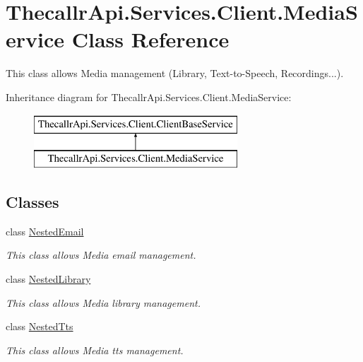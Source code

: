 \hypertarget{class_thecallr_api_1_1_services_1_1_client_1_1_media_service}{\section{Thecallr\+Api.\+Services.\+Client.\+Media\+Service Class Reference}
\label{class_thecallr_api_1_1_services_1_1_client_1_1_media_service}
}


This class allows Media management (Library, Text-\/to-\/\+Speech, Recordings...).  


Inheritance diagram for Thecallr\+Api.\+Services.\+Client.\+Media\+Service\+:\begin{figure}[H]
\begin{center}
\leavevmode
\includegraphics[height=2.000000cm]{class_thecallr_api_1_1_services_1_1_client_1_1_media_service}
\end{center}
\end{figure}
\subsection*{Classes}
\begin{DoxyCompactItemize}
\item 
class \hyperlink{class_thecallr_api_1_1_services_1_1_client_1_1_media_service_1_1_nested_email}{Nested\+Email}
\begin{DoxyCompactList}\small\item\em This class allows Media email management. \end{DoxyCompactList}\item 
class \hyperlink{class_thecallr_api_1_1_services_1_1_client_1_1_media_service_1_1_nested_library}{Nested\+Library}
\begin{DoxyCompactList}\small\item\em This class allows Media library management. \end{DoxyCompactList}\item 
class \hyperlink{class_thecallr_api_1_1_services_1_1_client_1_1_media_service_1_1_nested_tts}{Nested\+Tts}
\begin{DoxyCompactList}\small\item\em This class allows Media tts management. \end{DoxyCompactList}\end{DoxyCompactItemize}
